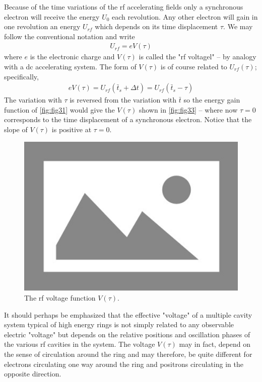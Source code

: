 Because of the time variations of the rf accelerating fields only a synchronous electron will receive the energy $U_0$ each revolution. Any other electron will gain in one revolution an energy $U_{rf}$ which depends on its time displacement $\tau$. We may follow the conventional notation and write
\begin{align}
	U_{rf} = eV(\tau)
\end{align}
where $e$ is the electronic charge and $V(\tau)$ is called the "rf voltagel" -- by analogy with a dc accelerating system. The form of $V(\tau)$ is of course related to $U_{rf}(\tau)$; specifically,
\begin{align}
	eV(\tau) = U_{rf}(\bar{t}_s + \Delta t) = U_{rf}(\bar{t}_s - \tau)
\end{align}
The variation with $\tau$ is reversed from the variation with $\bar{t}$ so the energy gain function of \autoref{fig:fig31} would give the $V(\tau)$ shown in \autoref{fig:fig33} -- where now $\tau = 0$ corresponds to the time displacement of a synchronous electron. Notice that the slope of $V(\tau)$ is positive at $\tau = 0$.

\begin{figure}[!htb]
	\centering
	\includegraphics[width=0.6\linewidth]{./Figuras/placeholder.png}
	\caption{The rf voltage function $V(\tau)$.}
	\label{fig:fig33}
\end{figure}

It should perhaps be emphasized that the effective "voltage" of a multiple cavity system typical of high energy rings is not simply related to any observable electric "voltage" but depends on the relative positions and oscillation phases of the various rf cavities in the system. The voltage $V(\tau)$ may in fact, depend on the sense of circulation around the ring and may therefore, be quite different for electrons circulating one way around the ring and positrons circulating in the opposite direction.

